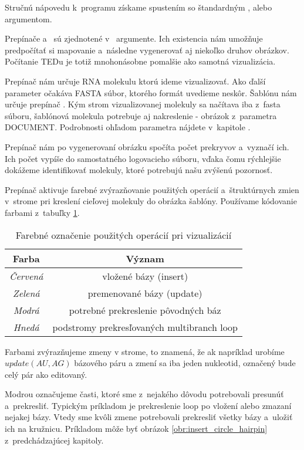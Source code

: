 Stručnú nápovedu k~programu získame spustením so štandardným
, alebo  argumentom.

Prepínače  a~ sú zjednotené v~ argumente.
Ich existencia nám umožňuje predpočítať si mapovanie a~následne vygenerovať
aj niekoľko druhov obrázkov. Počítanie TEDu je totiž mnohonásobne
pomalšie ako samotná vizualizácia.

Prepínač  nám určuje RNA molekulu ktorú ideme vizualizovať.
Ako ďalší parameter očakáva FASTA súbor, ktorého formát uvedieme neskôr.
Šablónu nám určuje prepínač .
Kým strom vizualizovanej molekuly sa načítava iba z~fasta súboru,
šablónová molekula potrebuje aj nakreslenie - obrázok z~parametra DOCUMENT.
Podrobnosti ohľadom parametra  nájdete v~kapitole .

Prepínač  nám po vygenerovaní obrázku spočíta počet prekryvov
a~vyznačí ich. Ich počet vypíše do samostatného logovacieho súboru, vďaka čomu
rýchlejšie dokážeme identifikovať molekuly, ktoré potrebujú našu zvýšenú
pozornosť.

Prepínač  aktivuje farebné zvýrazňovanie použitých operácií
a~štruktúrnych zmien v~strome pri kreslení cieľovej molekuly do obrázka
šablóny. Používame kódovanie farbami z~tabuľky \ref{tab:color_coding}.

\begin{table}
  \centering
  \begin{tabular}{c|c}
    Farba & Význam \\
    \toprule
    \textit{Červená} & vložené bázy (insert) \\
    \midrule
    \textit{Zelená} & premenované bázy (update) \\
    \midrule
    \textit{Modrá} & potrebné prekreslenie pôvodných báz \\
    \midrule
    \textit{Hnedá} & podstromy prekresľovaných multibranch loop \\
    \bottomrule
  \end{tabular}
  \caption{Farebné označenie použitých operácií pri vizualizácií}
  \label{tab:color_coding}
\end{table}

Farbami zvýrazňujeme zmeny v strome, to znamená, že ak napríklad
urobíme $update(AU, AG)$ bázového páru a zmení sa iba jeden nukleotid,
označený bude celý pár ako editovaný.

Modrou označujeme časti, ktoré sme z~nejakého dôvodu potrebovali presunúť a~prekresliť.
Typickým príkladom je prekreslenie loop po vložení alebo zmazaní nejakej bázy.
Vtedy sme kvôli zmene potrebovali prekresliť všetky bázy a~uložiť ich na kružnicu.
Príkladom môže byť obrázok \ref{obr:insert_circle_hairpin} z~predchádzajúcej kapitoly.

